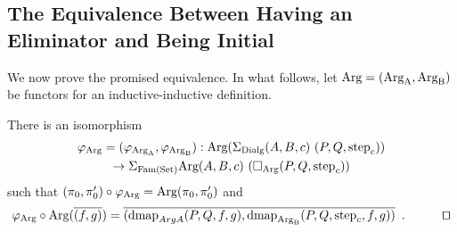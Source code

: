 \documentclass[orivec,envcountsame, ,envcountsect]{llncs}
\begin{document}
\subsection{The Equivalence Between Having an Eliminator and Being Initial}
\label{sec:elim-init-equiv}

We now prove the promised equivalence. In what follows, let $\text{Arg} = (\text{Arg}_{\text{A}},
\text{Arg}_{\text{B}})$ be functors for an inductive-inductive definition.

\begin{lemma}
\label{thm:isoArgAB}
  There is an isomorphism
\begin{multline*}
\varphi_{\ArgB} = (\varphi_{\ArgA}, \varphi_{\ArgBpp}) : \ArgB(\SigmaDialg (A, B, c)\ (P, Q, \stepind{c})) \\
  \to \SigmaFAM \ArgB(A, B, c)\ (\BOX_{\ArgB}(P, Q, \stepind{c})) %
\end{multline*}
such that $(\pi_0, \pi'_0) \circ \varphi_{\text{Arg}} =
\text{Arg}(\pi_0, \pi'_0)$ and
\[
\varphi_{\ArgB} \circ\ArgB(\CwFsect{(f, g)})
 = \CwFsect{(\dmap_{ArgA}(P, Q, f, g), \dmap_{\ArgBpp}(P, Q, \stepind{c}, f, g))} \enspace .
\tag*{\qed}
\]
\end{lemma}
\end{document}
